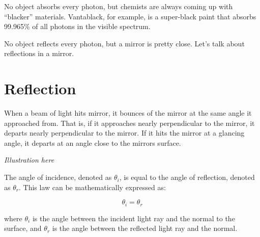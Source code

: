 No object absorbs every photon, but chemists are always coming up with
``blacker'' materials. Vantablack, for example, is a super-black paint
that absorbs 99.965\% of all photons in the visible spectrum.

No object reflects every photon, but a mirror is pretty close. Let's
talk about reflections in a mirror.

\section{Reflection}

When a beam of light hits mirror, it bounces of the mirror at the same
angle it approached from.  That is, if it approaches nearly
perpendicular to the mirror, it departs nearly perpendicular to the
mirror.  If it hits the mirror at a glancing angle, it departs at an
angle close to the mirrors surface.

\textit{Illustration here}

\begin{mdframed}[style=important, frametitle={Law of Reflection}]

The angle of incidence, denoted as $\theta_i$, is equal to
the angle of reflection, denoted as $\theta_r$. This law can be
mathematically expressed as:

$$\theta_i = \theta_r$$
 
where $\theta_i$ is the angle between the incident light ray and the
normal to the surface, and $\theta_r$ is the angle between the
reflected light ray and the normal.


\end{mdframed}

